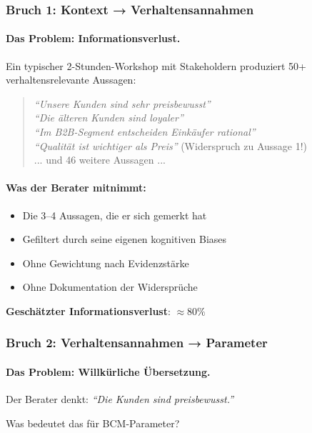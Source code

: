\subsubsection{Bruch 1: Kontext → Verhaltensannahmen}

\paragraph{Das Problem: Informationsverlust.}
Ein typischer 2-Stunden-Workshop mit Stakeholdern produziert 50+ verhaltensrelevante Aussagen:

\begin{quote}
\textit{``Unsere Kunden sind sehr preisbewusst''} \\
\textit{``Die älteren Kunden sind loyaler''} \\
\textit{``Im B2B-Segment entscheiden Einkäufer rational''} \\
\textit{``Qualität ist wichtiger als Preis''} (Widerspruch zu Aussage 1!) \\
... und 46 weitere Aussagen ...
\end{quote}

\paragraph{Was der Berater mitnimmt:}
\begin{itemize}
    \item Die 3--4 Aussagen, die er sich gemerkt hat
    \item Gefiltert durch seine eigenen kognitiven Biases
    \item Ohne Gewichtung nach Evidenzstärke
    \item Ohne Dokumentation der Widersprüche
\end{itemize}

\textbf{Geschätzter Informationsverlust}: $\approx 80\%$

\subsubsection{Bruch 2: Verhaltensannahmen → Parameter}

\paragraph{Das Problem: Willkürliche Übersetzung.}

Der Berater denkt: \textit{``Die Kunden sind preisbewusst.''}

Was bedeutet das für BCM-Parameter?

